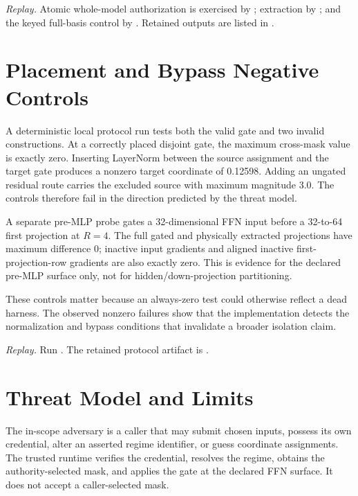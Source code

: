 \documentclass[11pt]{article}
\begin{document}
\noindent\textit{Replay.} Atomic whole-model authorization is exercised by
; extraction by
; and the keyed full-basis control
by . Retained outputs are
listed in .

\section{Placement and Bypass Negative Controls}

A deterministic local protocol run tests both the valid gate and two invalid
constructions. At a correctly placed disjoint gate, the maximum cross-mask value
is exactly zero. Inserting LayerNorm between the source assignment and the
target gate produces a nonzero target coordinate of 0.12598. Adding an ungated
residual route carries the excluded source with maximum magnitude 3.0. The
controls therefore fail in the direction predicted by the threat model.

A separate pre-MLP probe gates a 32-dimensional FFN input before a 32-to-64
first projection at $R=4$. The full gated and physically extracted projections
have maximum difference 0; inactive input gradients and aligned inactive
first-projection-row gradients are also exactly zero. This is evidence for the
declared pre-MLP surface only, not for hidden/down-projection partitioning.

These controls matter because an always-zero test could otherwise reflect a
dead harness. The observed nonzero failures show that the implementation detects
the normalization and bypass conditions that invalidate a broader isolation
claim.

\noindent\textit{Replay.} Run
. The retained protocol
artifact is
.

\section{Threat Model and Limits}

The in-scope adversary is a caller that may submit chosen inputs, possess its
own credential, alter an asserted regime identifier, or guess coordinate
assignments. The trusted runtime verifies the credential, resolves the regime,
obtains the authority-selected mask, and applies the gate at the declared FFN
surface. It does not accept a caller-selected mask.
\end{document}
